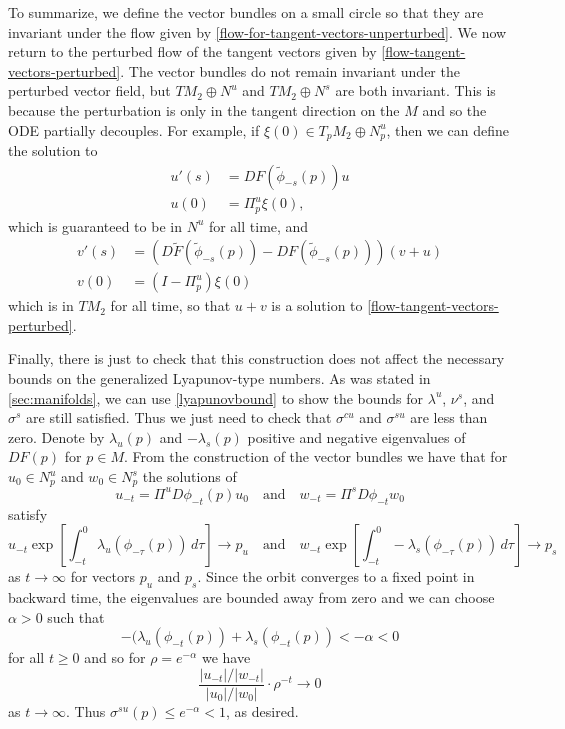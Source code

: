 To summarize, we define the vector bundles on a small circle so that they are invariant under the flow given by \cref{flow-for-tangent-vectors-unperturbed}. We now return to the perturbed flow of the tangent vectors given by \cref{flow-tangent-vectors-perturbed}. The vector bundles do not remain invariant under the perturbed vector field, but \(TM_2 \oplus N^u\) and \(TM_2 \oplus N^s\) are both invariant. This is because the perturbation is only in the tangent direction on the \(M\) and so the ODE partially decouples. For example, if \(\xi(0) \in T_pM_2 \oplus N^u_p\), then we can define the solution to 
\begin{equation*}
\begin{aligned}
	u'(s) &= DF(\tilde \phi_{-s}(p)) u\\
	u(0) &= \Pi^u_p \xi(0),
\end{aligned}
\end{equation*}
which is guaranteed to be in \(N^u\) for all time, and 
\begin{equation*}
\begin{aligned}
	v'(s) &= (D\tilde F(\tilde\phi_{-s}(p)) - DF(\tilde\phi_{-s}(p))) (v + u) \\
	v(0) &= (I - \Pi^u_p) \xi(0)
\end{aligned}
\end{equation*}
which is in \(TM_2\) for all time, so that \(u + v\) is a solution to \cref{flow-tangent-vectors-perturbed}.

Finally, there is just to check that this construction does not affect the necessary bounds on the generalized Lyapunov-type numbers. As was stated in \cref{sec:manifolds}, we can use \cref{lyapunovbound} to show the bounds for \(\lambda^u\), \(\nu^s\), and \(\sigma^s\) are still satisfied. Thus we just need to check that \(\sigma^{cu}\) and \(\sigma^{su}\) are less than zero. Denote by \(\lambda_u(p)\) and \(-\lambda_s(p)\) positive and negative eigenvalues of \(DF(p)\) for \(p \in M\). From the construction of the vector bundles we have that for \(u_0\in N^u_p\) and \(w_0\in N^s_p\) the solutions of
\begin{equation*}
	u_{-t} = \Pi^uD\phi_{-t}(p) u_0 \quad \text{and} \quad w_{-t} = \Pi^s D\phi_{-t} w_0
\end{equation*}
satisfy
\begin{equation*}
	u_{-t} \exp\left[ \int_{-t}^0 \lambda_u(\phi_{-\tau}(p) ) \, d\tau\right] \to p_u \quad \text{and}\quad  w_{-t} \exp\left[ \int_{-t}^0 -\lambda_s(\phi_{-\tau}(p) ) \, d\tau\right] \to p_s
\end{equation*}
as \(t\to\infty\) for vectors \(p_u\) and \(p_s\). Since the orbit converges to a fixed point in backward time, the eigenvalues are bounded away from zero and we can choose \(\alpha> 0\) such that
\begin{equation*}
	-(\lambda_u(\phi_{-t}(p)) + \lambda_s(\phi_{-t}(p)) < -\alpha < 0
\end{equation*}
for all \(t \geq 0 \) and so for \(\rho = e^{-\alpha}\) we have
\begin{equation*}
	\frac{|u_{-t}|/|w_{-t}|}{|u_0|/|w_0|} \cdot \rho^{-t} \to 0
\end{equation*}
as \(t\to\infty\). Thus \(\sigma^{su}(p) \leq e^{-\alpha} < 1\), as desired.

